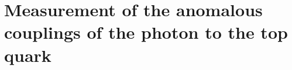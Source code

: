 \chapter{Measurement of the anomalous couplings of the photon to the top quark}\label{chap-anomolouscouplings}